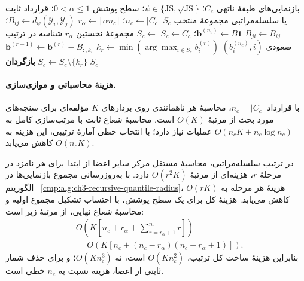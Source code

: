 \begin{algorithm}[!htbp]
\caption{زیرروال $\operatorname{PairwiseQuantileSubset}$: انتخاب چندکی با ترتیب زوجی}
\label{cmp:alg:ch3-pairwise-quantile-subset}
\begin{algorithmic}[1]
\REQUIRE بازنمایی‌های طبقهٔ ناتهی $C_c$؛ $\psi\in\{\mathrm{JS},\sqrt{\mathrm{JS}}\}$؛ سطح پوشش $0<\alpha\le1$؛ قرارداد ثابت یا سلسله‌مراتبی
\ENSURE مجموعهٔ منتخب $S_c$
\STATE $n_c\gets|C_c|$؛ $r_\alpha\gets\lceil\alpha n_c\rceil$
    \STATE $B_{ij}\gets d_\psi(\mathscr Y_i,\mathscr Y_j)$؛ $B_{ji}\gets B_{ij}$
\ENDFOR
\STATE $\mathbf b^{(n_c)}\gets B\mathbf1$؛ $S_c\gets C_c$
    \STATE $S_c\gets$ مجموعهٔ نخستین $r_\alpha$ شناسه در ترتیب صعودی $(b_i^{(n_c)},i)$
\ELSE
        \STATE $k_r\gets\min(\arg\max_{i\in S_c}b_i^{(r)})$
        \STATE $\mathbf b^{(r-1)}\gets\mathbf b^{(r)}-B_{:,k_r}$
        \STATE $S_c\gets S_c\setminus\{k_r\}$
    \ENDFOR
\ENDIF
\STATE \textbf{بازگردان} $S_c$
\end{algorithmic}
\end{algorithm}

\paragraph{هزینهٔ محاسباتی و موازی‌سازی.}
با قرارداد $n_c=|C_c|$، محاسبهٔ هر ناهمانندی
روی بردارهای $K$ مؤلفه‌ای برای سنجه‌های مورد
بحث از مرتبهٔ $O(K)$ است. محاسبهٔ شعاع ثابت با
مرتب‌سازی کامل به $O(n_cK+n_c\log n_c)$
عملیات نیاز دارد؛ با انتخاب خطی آمارهٔ ترتیبی،
این هزینه به $O(n_cK)$ کاهش می‌یابد.

در ترتیب سلسله‌مراتبی، محاسبهٔ مستقل مرکز سایر
اعضا از ابتدا برای هر نامزد در مرحلهٔ $r$،
هزینه‌ای از مرتبهٔ $O(r^2K)$ دارد. با به‌روزرسانی
مجموع بازنمایی‌ها در الگوریتم~
\ref{cmp:alg:ch3-recursive-quantile-radius}،
هزینهٔ هر مرحله به $O(rK)$ کاهش می‌یابد. هزینهٔ
کل برای یک سطح پوشش، با احتساب تشکیل مجموع
اولیه و محاسبهٔ شعاع نهایی، از مرتبهٔ زیر است:
\begin{equation}\label{cmp:eq:ch3-recursive-quantile-complexity}
\begin{aligned}
&O\left(K\left[n_c+r_\alpha+
\sum_{r=r_\alpha+1}^{n_c}r\right]\right)\\
&=O\left(K\left[n_c+
(n_c-r_\alpha)(n_c+r_\alpha+1)\right]\right).
\end{aligned}
\end{equation}
بنابراین هزینهٔ ساخت کل ترتیب، $O(Kn_c^2)$
است، نه $O(Kn_c^3)$؛ و برای حذف شمار ثابتی
از اعضا، هزینه نسبت به $n_c$ خطی است.

